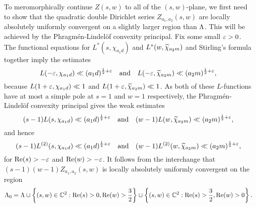 \documentclass[12pt,reqno,oneside]{amsart}
\begin{document}
     To meromorphically continue $Z(s,w)$ to all of the $(s,w)$-plane, we first need to show that the quadratic double Dirichlet series $Z_{a_{1},a_{2}}(s,w)$ are locally absolutely uniformly convergent on a slightly larger region than $\Lambda$. This will be achieved by the Phragm\'en-Lindel\"of convexity principal. Fix some small $\varepsilon > 0$. The functional equations for $L^{\ast}(s,\chi_{a_{1}d})$ and $L^{\ast}(w,\widetilde{\chi}_{a_{2}m})$ and Stirling's formula together imply the estimates
    \[
        L(-\varepsilon,\chi_{a_{1}d}) \ll (a_{1}d)^{\frac{1}{2}+\varepsilon} \quad \text{and} \quad L(-\varepsilon,\widetilde{\chi}_{a_{2}m}) \ll (a_{2}m)^{\frac{1}{2}+\varepsilon},
    \]
    because $L(1+\varepsilon,\chi_{a_{1}d}) \ll 1$ and $L(1+\varepsilon,\widetilde{\chi}_{a_{2}m}) \ll 1$. As both of these $L$-functions have at most a simple pole at $s = 1$ and $w = 1$ respectively, the Phragm\'en-Lindel\"of convexity principal gives the weak estimates
    \[
        (s-1)L(s,\chi_{a_{1}d}) \ll (a_{1}d)^{\frac{1}{2}+\varepsilon} \quad \text{and} \quad (w-1)L(w,\widetilde{\chi}_{a_{2}m}) \ll (a_{2}m)^{\frac{1}{2}+\varepsilon},
    \]
    and hence
    \[
        (s-1)L^{(2)}(s,\chi_{a_{1}d}) \ll (a_{1}d)^{\frac{1}{2}+\varepsilon} \quad \text{and} \quad (w-1)L^{(2)}(w,\widetilde{\chi}_{a_{2}m}) \ll (a_{2}m)^{\frac{1}{2}+\varepsilon},
    \]
    for $\mathrm{Re}(s) > -\varepsilon$ and $\mathrm{Re}(w) > -\varepsilon$. It follows from the interchange that $(s-1)(w-1)Z_{a_{1},a_{2}}(s,w)$ is locally absolutely uniformly convergent on the region
    \[
        \Lambda_{0} = \Lambda \cup \left\{(s,w) \in \mathbb{C}^{2}:\mathrm{Re}(s) > 0, \mathrm{Re}(w) > \frac{3}{2}\right\} \cup \left\{(s,w) \in \mathbb{C}^{2}:\mathrm{Re}(s) > \frac{3}{2}, \mathrm{Re}(w) > 0\right\}.
    \]
    
    \begin{center}
    \end{center}
    
\end{document}
